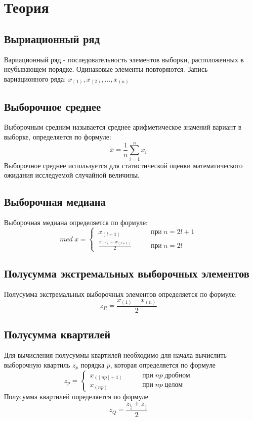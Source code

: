\documentclass{article}
\begin{document}
\newpage
\section{Теория}
\subsection{Выриационный ряд}
  Вариационный ряд - последовательность элементов выборки, расположенных в неубывающем порядке. Одинаковые элементы повторяются. Запись вариационного ряда: $x_{(1)}, x_{(2)}, ...,x_{(n)}$
\subsection{Выборочное среднее}
 Выборочным средним называется среднее арифметическое значений вариант в выборке, определяется по формуле:
 \begin{equation}
 \overline{x} = \frac{1}{n}\sum_{i=1}^{n}x_i
 \label{eq: 3}
 \end{equation}
 Выборочное среднее используется для статистической оценки математического ожидания исследуемой случайной величины.
\subsection{Выборочная медиана}
  Выборочная медиана определяется по формуле:
  \begin{equation}
  med \; x=\left \{\ 
  \begin{array}{rcl}
  x_{(l+1)}& \qquad \mbox{при} \; n=2l+1 \\
  \frac{x_{(l)}+x_{(l+1)}}{2}& \qquad \mbox{при} \; n=2l
  \end{array}\right.
  \label{eq: 4}
  \end{equation}
\subsection{Полусумма экстремальных выборочных элементов}
  Полусумма экстремальных выборочных элементов определяется по формуле:
  \begin{equation}
  z_R=\frac{x_{(1)}-x_{(n)}}{2}
  \label{eq: 5}
  \end{equation}
\subsection{Полусумма квартилей}
  Для вычисления полусуммы квартилей необходимо для начала вычислить выборочную квартиль $z_p$ порядка $p$, которая определяется по формуле
  \begin{equation}
   z_p=\left \{\ 
  \begin{array}{rcl}
  x_{([np]+1)}& \qquad \mbox{при} \; np \; \mbox{дробном} \\
  x_{(np)}& \qquad \mbox{при} \; np \; \mbox{целом}
  \end{array}\right.
  \label{eq: 6}
  \end{equation}
  Полусумма квартилей определяется по формуле
  \begin{equation}
  z_Q=\frac{z_{\frac{1}{4}} + z_{\frac{3}{4}}}{2}
  \label{eq: 7}
  \end{equation}
\end{document}
